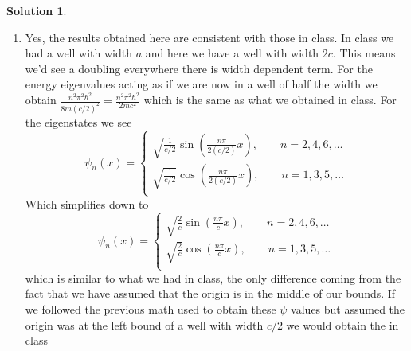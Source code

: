 \documentclass[10pt]{article}
\theoremstyle{definition}
\newtheorem{soln}{Solution}
\begin{document}
\begin{soln}
\begin{enumerate}[label=(\alph*)]
\begin{enumerate}[label=(\roman*)]
\begin{center}
                  \end{center}
            \item Yes, the results obtained here are consistent with those in class. In class we had a well with width $a$ and here we have a well with width
                  $2c$. This means we'd see a doubling everywhere there is width dependent term.
                  For the energy eigenvalues acting as if we are now in a well of half the width we obtain $\displaystyle\frac{n^2\pi^2\hbar^2}{8m(c/2)^2}=\frac{n^2\pi^2\hbar^2}{2mc^2}$
                  which is the same as what we obtained in class. For the eigenstates we see
                  $$
                    \psi_n(x) =
                    \begin{cases}
                      \sqrt{\frac{1}{c/2}}\sin(\frac{n\pi}{2(c/2)}x),\qquad n=2,4,6,\dots \\
                      \sqrt{\frac{1}{c/2}}\cos(\frac{n\pi}{2(c/2)}x),\qquad n=1,3,5,\dots \\
                    \end{cases}
                  $$
                  Which simplifies down to
                  $$
                    \psi_n(x) =
                    \begin{cases}
                      \sqrt{\frac{2}{c}}\sin(\frac{n\pi}{c}x),\qquad n=2,4,6,\dots \\
                      \sqrt{\frac{2}{c}}\cos(\frac{n\pi}{c}x),\qquad n=1,3,5,\dots \\
                    \end{cases}
                  $$
                  which is similar to what we had in class, the only difference coming from the fact that we have assumed that the origin is in the middle of our bounds.
                  If we followed the previous math used to obtain these $\psi$ values but assumed the origin was at the left bound of a well with width $c/2$ we would obtain the in class

\end{enumerate}
\end{enumerate}
\end{soln}
\end{document}
